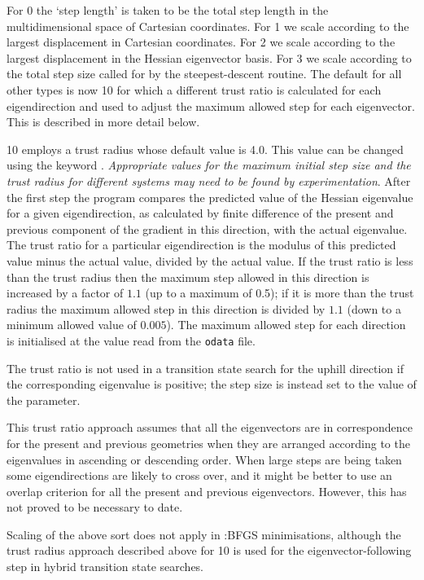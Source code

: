 {{{For {} 0 the `step length' is taken to be the total step length in the multidimensional
space of Cartesian coordinates. For {} 1 we scale according to the largest displacement
in Cartesian coordinates. For {} 2 we scale according to the largest displacement
in the Hessian eigenvector basis. For {} 3 we scale according to the total step size
called for by the steepest-descent routine. The default for all other  types is now
{} 10 for which a different trust ratio is calculated for each eigendirection and used 
to adjust the maximum allowed step for each eigenvector. This
is described in more detail below.\cite{walesw96}

{} 10 employs a trust radius whose default value is 4.0. This value can be changed
using the keyword {}.
{\it Appropriate values for the maximum initial step size and the trust radius
for different systems may need to be found by experimentation\/}. After the first step the
program compares the predicted value of the Hessian eigenvalue for a given eigendirection,
as calculated by finite difference of the present and previous component of the gradient in
this direction, with the actual eigenvalue. The trust ratio for a particular eigendirection
is the modulus of this predicted value minus the actual value, divided by the actual value. 
If the trust ratio is less than the trust radius then the maximum step allowed in this
direction is increased by a factor of $1.1$ (up to a maximum of 0.5); if it is more
than the trust radius the maximum allowed step in this direction is divided by $1.1$ (down
to a minimum allowed value of $0.005$). The maximum allowed step for each direction is
initialised at the value read from the {\tt odata} file. 

The trust ratio is not used in a transition state search for the uphill direction if the 
corresponding eigenvalue is positive; the step size is instead set to the value
of the {} parameter.

This trust ratio approach assumes that all the eigenvectors are in correspondence for the present and
previous geometries when they are arranged according to the eigenvalues in ascending or
descending order. When large steps are being taken some eigendirections are likely to cross
over, and it might be better to use an overlap criterion for all the present and previous
eigenvectors. However, this has not proved to be necessary to date.

Scaling of the above sort does not apply in :BFGS minimisations, although the
trust radius approach described above for {} 10 is used for the eigenvector-following
step in hybrid transition state searches.

}}}
